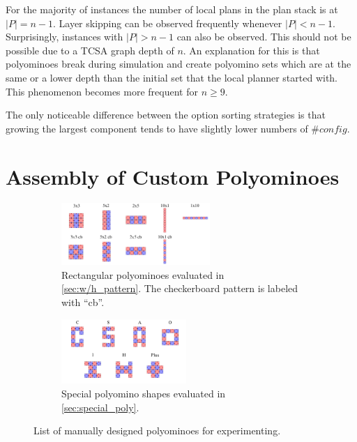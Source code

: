 For the majority of instances the number of local plans in the plan stack is at $|P| = n-1$.
Layer skipping can be observed frequently whenever $|P| < n-1$.
Surprisingly, instances with $|P| > n-1$ can also be observed.
This should not be possible due to a TCSA graph depth of $n$.
An explanation for this is that polyominoes break during simulation and create polyomino sets which are at the same or a lower depth than the initial set that the local planner started with.
This phenomenon becomes more frequent for $n \geq 9$.

The only noticeable difference between the option sorting strategies is that growing the largest component tends to have slightly lower numbers of $\#\textit{config}$.


\section{Assembly of Custom Polyominoes}
\label{sec:AFTS}

\begin{figure}
	\centering
	\begin{subfigure}[b]{\textwidth}
		\centering
		\includegraphics[width=0.62\textwidth]{figures/AFTS_cb_shapes.pdf}
		\caption{Rectangular polyominoes evaluated in \autoref{sec:w/h_pattern}. The checkerboard pattern is labeled with ``cb''. \hfill}
		\label{fig:AFTS_cb_shapes}
	\end{subfigure}
	\begin{subfigure}[b]{\textwidth}
		\centering
		\includegraphics[width=0.52\textwidth]{figures/AFTS_sp_shapes.pdf}
		\caption{Special polyomino shapes evaluated in \autoref{sec:special_poly}.}
		\label{fig:AFTS_sp_shapes}
	\end{subfigure}
	\caption[List of manually designed polyominoes for experimenting]{List of manually designed polyominoes for experimenting.}
	\label{fig:AFTS_shapes}
\end{figure}

